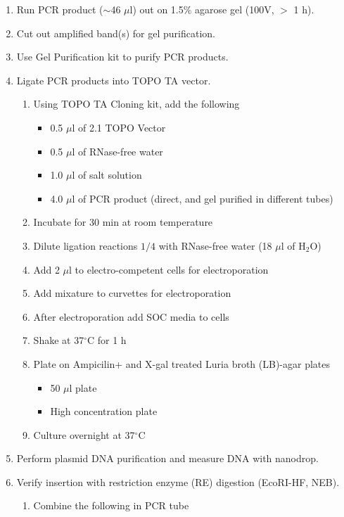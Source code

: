 \begin{enumerate}
\item Run PCR product ($\sim$46 $\mu$l) out on 1.5\% agarose gel (100V, $>$ 1 h).
\item Cut out amplified band(s) for gel purification.
\item Use Gel Purification kit to purify PCR products.
\item Ligate PCR products into TOPO TA vector.
  \begin{enumerate}
  \item Using TOPO TA Cloning kit, add the following
    \begin{itemize}
    \item 0.5 $\mu$l of 2.1 TOPO Vector
    \item 0.5 $\mu$l of RNase-free water
    \item 1.0 $\mu$l of salt solution
    \item 4.0 $\mu$l of PCR product (direct, and gel purified in different tubes)
    \end{itemize}
  \item Incubate for 30 min at room temperature
  \item Dilute ligation reactions $1/4$ with RNase-free water (18 $\mu$l of H$_2$O)
  \item Add 2 $\mu$l to electro-competent cells for electroporation
  \item Add mixature to curvettes for electroporation
  \item After electroporation add SOC media to cells
  \item Shake at 37$^{\circ}$C for 1 h
  \item Plate on Ampicilin+ and X-gal treated Luria broth (LB)-agar plates
    \begin{itemize}
    \item 50 $\mu$l plate
    \item High concentration plate
    \end{itemize}
  \item Culture overnight at 37$^{\circ}$C
  \end{enumerate}
\item Perform plasmid DNA purification and measure DNA with nanodrop.
\item Verify insertion with restriction enzyme (RE) digestion (EcoRI-HF, NEB).
  \begin{enumerate}
  \item Combine the following in PCR tube
    \begin{itemize}

\end{itemize}
\end{enumerate}
\end{enumerate}
